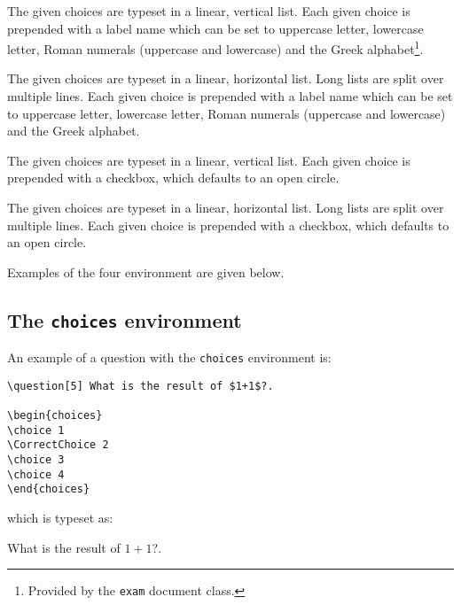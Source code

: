 \documentclass[12pt,a4paper]{exam}
\begin{document}
\begin{description}[labelindent=2ex]
\item[\texttt{choices}] The given choices are typeset in a linear, vertical list.
Each given choice is prepended with a label name which can be set to uppercase
letter, lowercase letter, Roman numerals (uppercase and lowercase) and the Greek
alphabet\footnote{Provided by the \texttt{exam} document class.}.

\item[\texttt{oneparchoices}] The given choices are typeset in a linear, horizontal list.
Long lists are split over multiple lines.
Each given choice is prepended with a label name which can be set to uppercase
letter, lowercase letter, Roman numerals (uppercase and lowercase) and the Greek
alphabet.

\item[\texttt{checkboxes}] The given choices are typeset in a  linear, vertical list.
Each given choice is prepended with a checkbox, which defaults to an open circle.

\item[\texttt{oneparcheckboxes}] The given choices are typeset in a  linear, horizontal
list. Long lists are split over multiple lines.
Each given choice is prepended with a checkbox, which defaults to an open circle.

\end{description}

Examples of the four environment are given below.

\subsection{The \texttt{choices} environment}

An example of a question with the \texttt{choices} environment is:

\begin{lstlisting}
\question[5] What is the result of $1+1$?.

\begin{choices}
\choice 1
\CorrectChoice 2
\choice 3
\choice 4
\end{choices}
\end{lstlisting}

which is typeset as:

\begin{questions}
\setcounter{question}{0}
\question[5] What is the result of $1+1$?.

\begin{choices}
\end{choices}
\end{questions}
\end{document}

